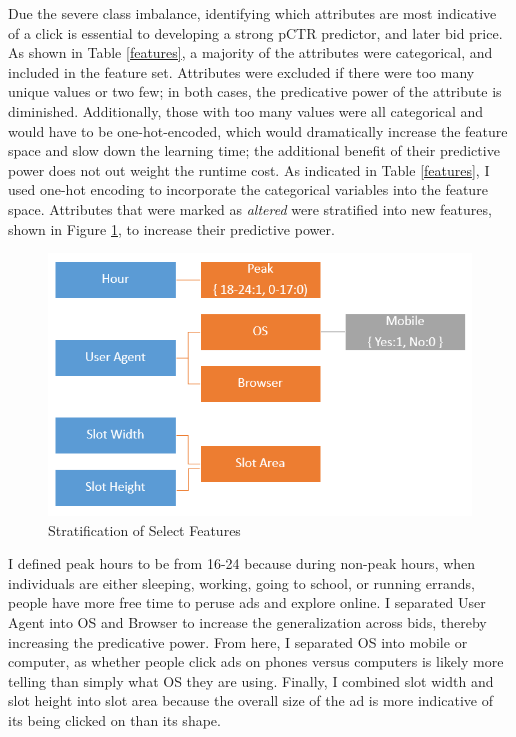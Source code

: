 \documentclass{sig-alternate-05-2015}
\begin{document}
Due the severe class imbalance, identifying which attributes are most indicative of a click is essential to developing a strong pCTR predictor, and later bid price.  As shown in Table \ref{features}, a majority of the attributes were categorical, and included in the feature set.  Attributes were excluded if there were too many unique values or two few; in both cases, the predicative power of the attribute is diminished. Additionally, those with too many values were all categorical and would have to be one-hot-encoded, which would dramatically increase the feature space and slow down the learning time; the additional benefit of their predictive power does not out weight the runtime cost. As indicated in Table \ref{features}, I used one-hot encoding to incorporate the categorical variables into the feature space.  Attributes that were marked as \textit{altered} were stratified into new features, shown in Figure \ref{stratifiedFeatures}, to increase their predictive power.

\begin{figure}[h]
 \centering
 \includegraphics[width=1\linewidth]{modifiedFeatures.png}
 \caption{Stratification of Select Features}
 \label{stratifiedFeatures}
\end{figure}

I defined peak hours to be from 16-24 because during non-peak hours, when individuals are either sleeping, working, going to school, or running errands, people have more free time to peruse ads and explore online. I separated User Agent into OS and Browser to increase the generalization across bids, thereby increasing the predicative power. From here, I separated OS into mobile or computer, as whether people click ads on phones versus computers is likely more telling than simply what OS they are using.  Finally, I combined slot width and slot height into slot area because the overall size of the ad is more indicative of its being clicked on than its shape.
\end{document}
